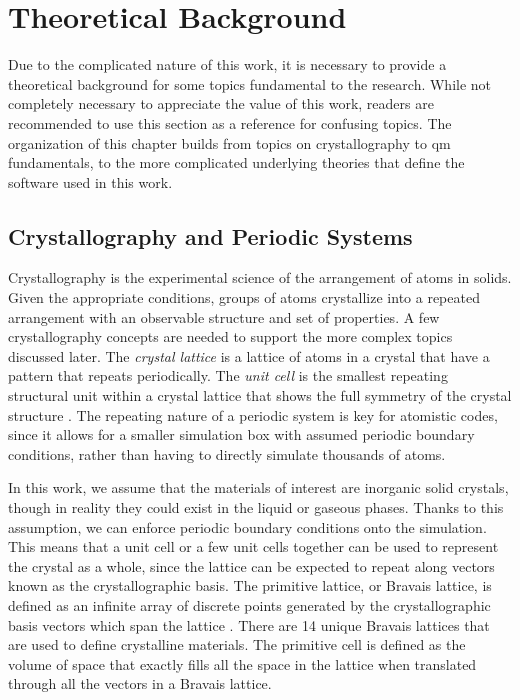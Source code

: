 
\chapter{Theoretical Background}\label{chap:background}

Due to the complicated nature of this work, it is necessary to provide a theoretical background for some topics fundamental to the research. While not completely necessary to appreciate the value of this work, readers are recommended to use this section as a reference for confusing topics. The organization of this chapter builds from topics on crystallography to \gls{qm} fundamentals, to the more complicated underlying theories that define the software used in this work. %

\section{Crystallography and Periodic Systems}

Crystallography is the experimental science of the arrangement of atoms in solids. Given the appropriate conditions, groups of atoms crystallize into a repeated arrangement with an observable structure and set of properties. A few crystallography concepts are needed to support the more complex topics discussed later. The \textit{crystal lattice} is a lattice of atoms in a crystal that have a pattern that repeats periodically. The \textit{unit cell} is the smallest repeating structural unit within a crystal lattice that shows the full symmetry of the crystal structure \autocite{westSolidStateChemistry2022}. The repeating nature of a periodic system is key for atomistic codes, since it allows for a smaller simulation box with assumed periodic boundary conditions, rather than having to directly simulate thousands of atoms. 

In this work, we assume that the materials of interest are inorganic solid crystals, though in reality they could exist in the liquid or gaseous phases. Thanks to this assumption, we can enforce periodic boundary conditions onto the simulation. This means that a unit cell or a few unit cells together can be used to represent the crystal as a whole, since the lattice can be expected to repeat along vectors known as the crystallographic basis. The primitive lattice, or Bravais lattice, is defined as an infinite array of discrete points generated by the crystallographic basis vectors which span the lattice \autocite{ashcroftSolidStatePhysics1976}. There are 14 unique Bravais lattices that are used to define crystalline materials. The primitive cell is defined as the volume of space that exactly fills all the space in the lattice when translated through all the vectors in a Bravais lattice.

